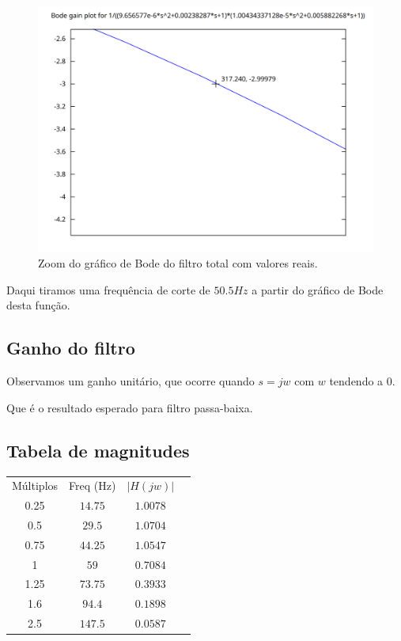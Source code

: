 \documentclass[12pt,twoside, a4paper, twocolumn]{article}
\begin{document}
\begin{figure}[htbp!]
    \centering
    \includegraphics[width=1\columnwidth]{images/zoomHtotal.png}
    \caption{Zoom do gráfico de Bode do filtro total com valores reais.}
\end{figure}


Daqui tiramos uma frequência de corte de $50.5Hz$ a partir do gráfico de Bode desta função.




\pagebreak


\subsection{Ganho do filtro}


Observamos um ganho unitário, que ocorre quando $s = jw$ com $w$ tendendo a $0$.


Que é o resultado esperado para filtro passa-baixa.




\subsection{Tabela de magnitudes}


\begin{center}
    \begin{tabular}{ |c|c|c|c| }
        \hline
        Múltiplos & Freq (Hz) & $\left| H(jw) \right|$ \\
        0.25      & $14.75$   & $1.0078$               \\
        0.5       & $29.5$    & $1.0704$               \\
        0.75      & $44.25$   & $1.0547$               \\
        1         & $59$      & $0.7084$               \\
        1.25      & $73.75$   & $0.3933$               \\
        1.6       & $94.4$    & $0.1898$               \\
        2.5       & $147.5$   & $0.0587$               \\
        \hline
    \end{tabular}
\end{center}
\end{document}
